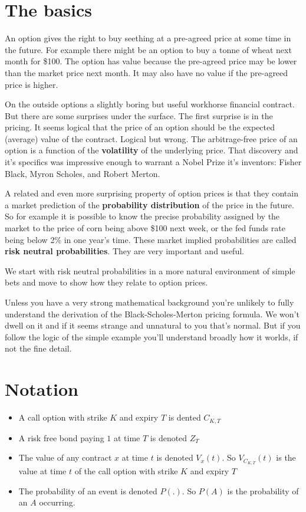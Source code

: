

\section{The basics}

An option gives the right to buy seething at a pre-agreed price at some time in the future. For example there might be an option to buy a tonne of wheat next month for \$100. The option has value because the pre-agreed price may be lower than the market price next month. It may also have no value if the pre-agreed price is higher. 

On the outside options a slightly boring but useful workhorse financial contract. But there are some surprises under the surface. The first surprise is in the pricing. It seems logical that the price of an option should be the expected (average) value of the contract. Logical but wrong. The arbitrage-free price of an option is a function of the \textbf{volatility} of the underlying price. That discovery and it's specifics was impressive enough to warrant a Nobel Prize it's inventors: Fisher Black, Myron Scholes, and Robert Merton. 

A related and even more surprising property of option prices is that they contain a market prediction of the \textbf{probability distribution} of the price in the future. So for example it is possible to know the precise probability assigned by the market to the price of corn being above \$100 next week, or the fed funds rate being below 2\% in one year's time. These market implied probabilities are called \textbf{risk neutral probabilities}. They are very important and useful. 

We start with risk neutral probabilities in a more natural environment of simple bets and move to show how they relate to option prices. 

Unless you have a very strong mathematical background you're unlikely to fully understand the derivation of the Black-Scholes-Merton pricing formula. We won't dwell on it and if it seems strange and unnatural to you that's normal. But if you follow the logic of the simple example you'll understand broadly how it worlds, if not the fine detail.

\section{Notation}


\begin{itemize}
\item A call option with strike $K$ and expiry $T$ is dented $C_{K,T}$
\item A risk free bond paying $1$ at time $T$ is denoted $Z_T$
\item The value of any contract $x$ at time $t$ is denoted $V_x(t)$. So $V_{C_{K,T}}(t)$ is the value at time $t$ of the call option with strike $K$ and expiry $T$
\item The probability of an event is denoted $P(.)$. So $P(A)$ is the probability of an $A$ occurring. 
\end{itemize}


